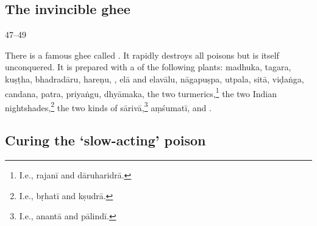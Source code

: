 \newpage

    \subsection{The invincible ghee}
    
  \begin{translation}
    
    \item[ 47--49]
    
    \label{ajeya} There is a famous ghee called . It
rapidly destroys all poisons but is itself unconquered. It is prepared with a
 of the following plants: %
\gls{madhuka},
\gls{tagara},
\gls{kuṣṭha},
\gls{bhadradāru},
\gls{hareṇu},
,
\gls{elā}
and \gls{elavālu},
\gls{nāgapuṣpa},
\gls{utpala},
\gls{sitā},
\gls{viḍaṅga},
\gls{candana},
\gls{patra},
\gls{priyaṅgu},
\gls{dhyāmaka},
the two turmerics,\footnote{I.e., \gls{rajanī} and \gls{dāruharidrā}.}
the two Indian nightshades,\footnote{I.e., \gls{bṛhatī} and \gls{kṣudrā}.}
the two kinds of \gls{sārivā},\footnote{I.e., \gls{anantā} and \gls{pālindī}.}
\gls{aṃśumatī},
and 
.
    
    \end{translation}

    \subsection{Curing the `slow-acting' poison}
    

